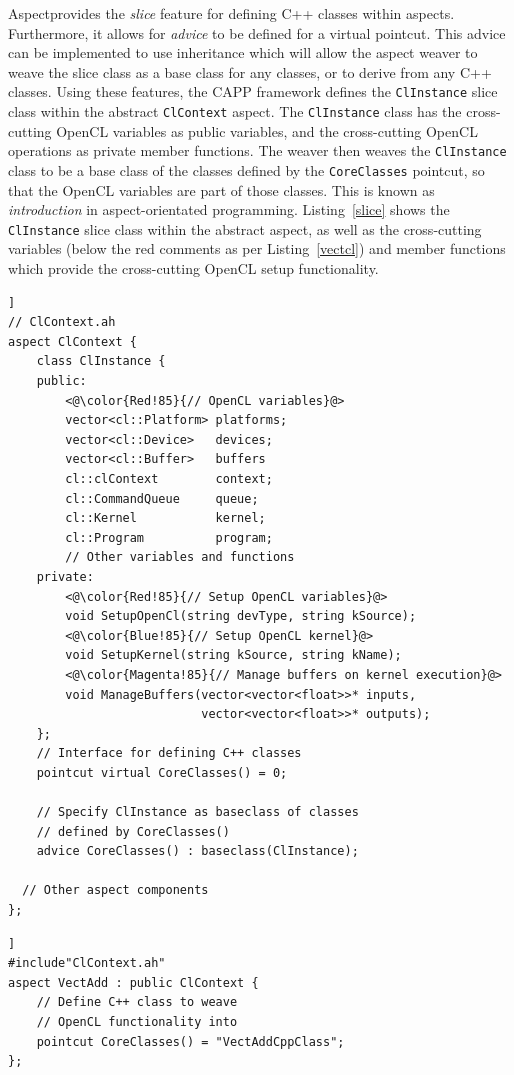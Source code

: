 \documentclass{sig-alternate-05-2015}
\begin{document}
Aspect\CPP provides the \textit{slice} feature for defining C++ classes within
aspects. Furthermore, it allows for \textit{advice} to be defined for a 
virtual pointcut. This advice can be implemented to use \CPP inheritance which
will allow the aspect weaver to weave the slice class as a base class for 
any \CPP classes, or to derive from any C++ classes. Using these features, the  CAPP framework defines the 
\lstinline$ClInstance$ slice class within the abstract \lstinline$ClContext$ aspect.  
The \lstinline$ClInstance$ class has the cross-cutting OpenCL variables as public
variables, and the cross-cutting OpenCL operations as private member functions.
The weaver then weaves the \lstinline$ClInstance$ class to be a base class of the \CPP
classes defined by the \lstinline$CoreClasses$ pointcut, so that the OpenCL variables 
are part of those \CPP classes. This is known as \textit{introduction} in
aspect-orientated programming.
Listing~\ref{slice} shows the \lstinline$ClInstance$ slice class within the abstract aspect,
as well as the cross-cutting variables (below the red comments as per 
Listing~\ref{vectcl}) and member functions which provide the cross-cutting
OpenCL setup functionality.

\begin{lstlisting}[caption=Abstract ClContext aspect which defines the OpenCL variables
required for parallel programming.,label=slice,float=[!t]]
// ClContext.ah
aspect ClContext {
	class ClInstance {
	public:
		<@\color{Red!85}{// OpenCL variables}@>
		vector<cl::Platform> platforms;
		vector<cl::Device>   devices;
		vector<cl::Buffer>   buffers
		cl::clContext        context;
		cl::CommandQueue     queue;
		cl::Kernel           kernel;
		cl::Program          program;
		// Other variables and functions 
	private:
		<@\color{Red!85}{// Setup OpenCL variables}@>
		void SetupOpenCl(string devType, string kSource);
		<@\color{Blue!85}{// Setup OpenCL kernel}@>
		void SetupKernel(string kSource, string kName);
		<@\color{Magenta!85}{// Manage buffers on kernel execution}@>
		void ManageBuffers(vector<vector<float>>* inputs,
		                   vector<vector<float>>* outputs);
	};
	// Interface for defining C++ classes
	pointcut virtual CoreClasses() = 0;

	// Specify ClInstance as baseclass of classes
	// defined by CoreClasses()
	advice CoreClasses() : baseclass(ClInstance);

  // Other aspect components
};
\end{lstlisting}

\begin{lstlisting}[caption=Derived aspect defining a \CPP class into which the OpenCL 
	functionality should be woven.,label=dslice,float=[!t]]
#include"ClContext.ah"
aspect VectAdd : public ClContext {
	// Define C++ class to weave
	// OpenCL functionality into
	pointcut CoreClasses() = "VectAddCppClass";
};
\end{lstlisting}
\end{document}
